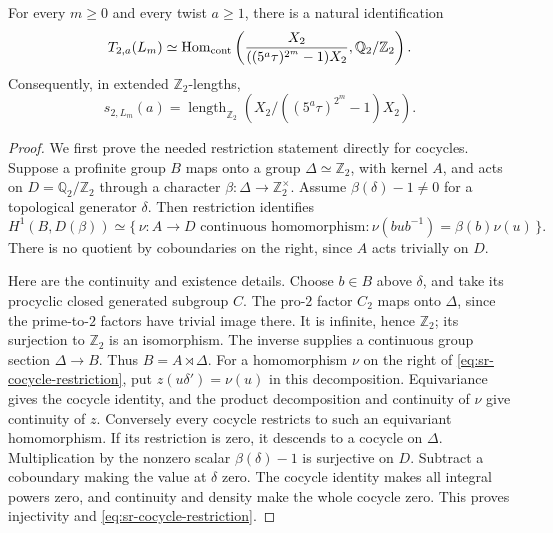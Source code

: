 \begin{srproposition}\label{prop:sr-dyadic-descent}
For every \(m\geq0\) and every twist \(a\geq1\), there is a natural
identification
\[
 T_{2,a}(L_m)\simeq
 \operatorname{Hom}_{\rm cont}\left(
  \frac{X_2}{((5^a\tau)^{2^m}-1)X_2},
                    \mathbb Q_2/\mathbb Z_2\right).
\]
Consequently, in extended \(\mathbb Z_2\)-lengths,
\begin{equation}\label{eq:sr-dyadic-coker}
 s_{2,L_m}(a)=
 \operatorname{length}_{\mathbb Z_2}
       \left(X_2/((5^a\tau)^{2^m}-1)X_2\right).
\end{equation}
\end{srproposition}
\begin{proof}
We first prove the needed restriction statement directly for cocycles.
Suppose a profinite group \(B\) maps onto a group
\(\Delta\simeq\mathbb Z_2\), with kernel \(A\), and acts on
\(D=\mathbb Q_2/\mathbb Z_2\) through a character
\(\beta:\Delta\to\mathbb Z_2^\times\).
Assume \(\beta(\delta)-1\ne0\) for a topological generator \(\delta\).
Then restriction identifies
\begin{equation}\label{eq:sr-cocycle-restriction}
 H^1(B,D(\beta))\simeq
 \{\,\nu:A\to D\text{ continuous homomorphism}:
       \nu(bub^{-1})=\beta(b)\nu(u)\,\}.
\end{equation}
There is no quotient by coboundaries on the right, since \(A\) acts
trivially on \(D\).

Here are the continuity and existence details.
Choose \(b\in B\) above \(\delta\), and take its procyclic closed
generated subgroup \(C\).
The pro-\(2\) factor \(C_2\) maps onto \(\Delta\), since the
prime-to-\(2\) factors have trivial image there.
It is infinite, hence \(\mathbb Z_2\); its surjection to
\(\mathbb Z_2\) is an isomorphism.
The inverse supplies a continuous group section
\(\Delta\to B\). Thus \(B=A\rtimes\Delta\).
For a homomorphism \(\nu\) on the right of
\eqref{eq:sr-cocycle-restriction}, put
\(z(u\delta')=\nu(u)\) in this decomposition.
Equivariance gives the cocycle identity, and the product decomposition
and continuity of \(\nu\) give continuity of \(z\).
Conversely every cocycle restricts to such an equivariant homomorphism.
If its restriction is zero, it descends to a cocycle on \(\Delta\).
Multiplication by the nonzero scalar \(\beta(\delta)-1\) is
surjective on \(D\). Subtract a coboundary making the value at
\(\delta\) zero. The cocycle identity makes all integral powers
zero, and continuity and density make the whole cocycle zero.
This proves injectivity and \eqref{eq:sr-cocycle-restriction}.


\end{proof}
